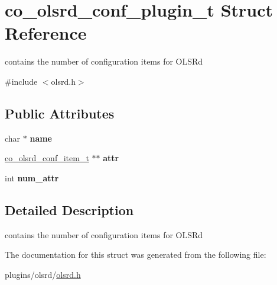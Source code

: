\hypertarget{structco__olsrd__conf__plugin__t}{\section{co\-\_\-olsrd\-\_\-conf\-\_\-plugin\-\_\-t Struct Reference}
\label{structco__olsrd__conf__plugin__t}
}


contains the number of configuration items for O\-L\-S\-Rd  




{\ttfamily \#include $<$olsrd.\-h$>$}

\subsection*{Public Attributes}
\begin{DoxyCompactItemize}
\item 
\hypertarget{structco__olsrd__conf__plugin__t_a319fc3a99ae0a19e8f89fba89b06d8b4}{char $\ast$ {\bfseries name}}\label{structco__olsrd__conf__plugin__t_a319fc3a99ae0a19e8f89fba89b06d8b4}

\item 
\hypertarget{structco__olsrd__conf__plugin__t_a72daafcaa49bd4edea53ef7e8d45a113}{\hyperlink{structco__olsrd__conf__item__t}{co\-\_\-olsrd\-\_\-conf\-\_\-item\-\_\-t} $\ast$$\ast$ {\bfseries attr}}\label{structco__olsrd__conf__plugin__t_a72daafcaa49bd4edea53ef7e8d45a113}

\item 
\hypertarget{structco__olsrd__conf__plugin__t_a52fda09be70bafa8dcfc9a3c444bad30}{int {\bfseries num\-\_\-attr}}\label{structco__olsrd__conf__plugin__t_a52fda09be70bafa8dcfc9a3c444bad30}

\end{DoxyCompactItemize}


\subsection{Detailed Description}
contains the number of configuration items for O\-L\-S\-Rd 

The documentation for this struct was generated from the following file\-:\begin{DoxyCompactItemize}
\item 
plugins/olsrd/\hyperlink{olsrd_8h}{olsrd.\-h}\end{DoxyCompactItemize}
